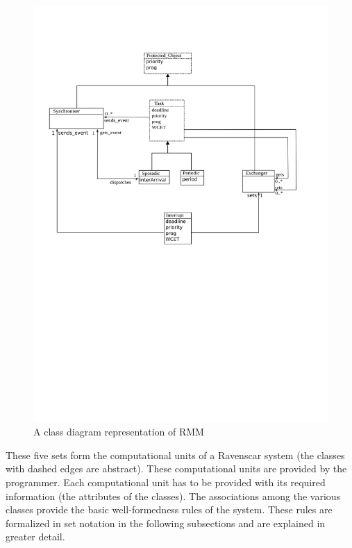 \begin{figure}
\centering
\includegraphics[scale=0.75]{figs/rmm}
\caption{A class diagram representation of RMM}
\label{fig:rmm}
\end{figure}

These five sets form the computational units of a Ravenscar system
(the classes with dashed edges are abstract). These computational
units are provided by the programmer. Each computational unit has to
be provided with its required information (the attributes of the
classes). The associations among the various classes provide the basic
well-formedness rules of the system. These rules are formalized in set
notation in the following subsections and are explained in greater
detail.

